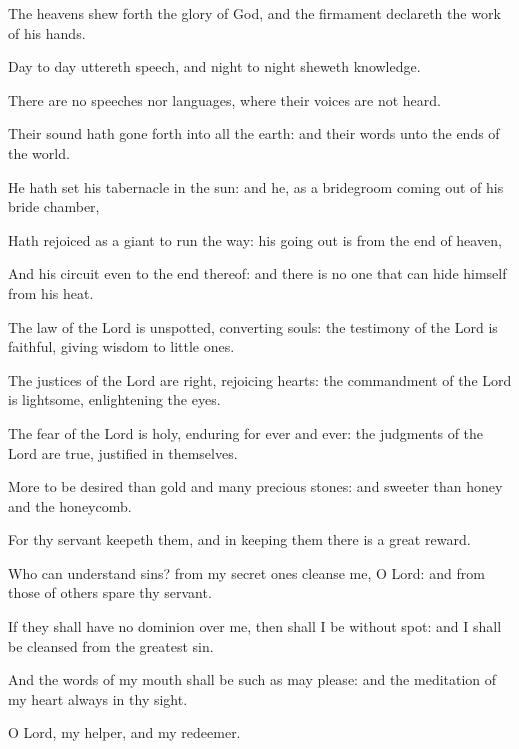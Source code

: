 ﻿\item The heavens shew forth the glory of God, and the firmament declareth the work of his hands.
\item Day to day uttereth speech, and night to night sheweth knowledge.
\item There are no speeches nor languages, where their voices are not heard.
\item Their sound hath gone forth into all the earth: and their words unto the ends of the world.
\item He hath set his tabernacle in the sun: and he, as a bridegroom coming out of his bride chamber,
\item Hath rejoiced as a giant to run the way: his going out is from the end of heaven,
\item And his circuit even to the end thereof: and there is no one that can hide himself from his heat.
\item The law of the Lord is unspotted, converting souls: the testimony of the Lord is faithful, giving wisdom to little ones.
\item The justices of the Lord are right, rejoicing hearts: the commandment of the Lord is lightsome, enlightening the eyes.
\item The fear of the Lord is holy, enduring for ever and ever: the judgments of the Lord are true, justified in themselves.
\item More to be desired than gold and many precious stones: and sweeter than honey and the honeycomb.
\item For thy servant keepeth them, and in keeping them there is a great reward.
\item Who can understand sins? from my secret ones cleanse me, O Lord: and from those of others spare thy servant.
\item If they shall have no dominion over me, then shall I be without spot: and I shall be cleansed from the greatest sin.
\item And the words of my mouth shall be such as may please: and the meditation of my heart always in thy sight.
\item O Lord, my helper, and my redeemer.